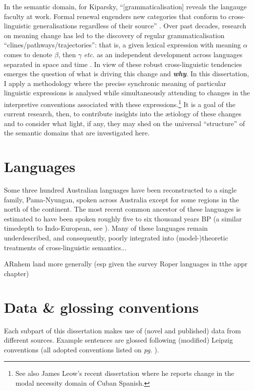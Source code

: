 \documentclass[12pt,dvipsnames]{report}
\begin{document}
In the semantic domain, for Kiparsky, ``[grammaticalisation] reveals the langauge faculty at work. Formal renewal engenders new categories that conform to cross-linguistic generalisations regardless of their source'' \citep[73]{Kiparsky2015}. Over past decades, research on meaning change has led to the discovery of regular grammaticalisation ``clines/pathways/trajectories'': that is, a given lexical expression with meaning $ \alpha $ comes to denote $ \beta $, then $ \gamma $ \textit{etc.} as an independent development across languages separated in space and time \citep[see][]{Deo2015,Eckardt2011}. In view of these robust cross-linguistic tendencies emerges the question of what is driving this change and \textbf{\textit{why}}. In this dissertation, I apply a methodology where the precise synchronic meaning of particular linguistic expressions is analysed while simultaneously attending to changes in the interpretive conventions associated with these expressions.\footnote{See also James Leow's recent \citeyearpar{Leow2020} dissertation where he reports change in the modal necessity domain of Cuban Spanish.} It is a goal of the current research, then, to contribute insights into the ætiology of these changes and to consider what light, if any, they may shed on the universal ``structure'' of the semantic domains that are investigated here.

\section{Languages}
{\color{Blue}
Some three hundred Australian languages have been reconstructed to a single family, Pama-Nyungan, spoken across Australia except for some regions in the north of the continent. The most recent common ancestor of these languages is estimated to have been spoken roughly five to six thousand years \textsc{BP} (a similar timedepth to Indo-European, see \citealt[742]{Bouckaert2018}). Many of these languages remain underdescribed, and consequently, poorly integrated into (model-)theoretic treatments of cross-linguistic semantics...



ARnhem land more generally (esp given the survey Roper languages in tthe appr chapter)
}
\section{Data \& glossing conventions}

Each subpart of this dissertation makes use of (novel and published) data from different sources. Example sentences are glossed following (modified) Leipzig conventions (all adopted conventions listed on \textit{pg.} \pageref{}).
\end{document}
